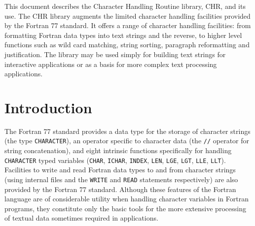 This document describes the Character Handling Routine library, CHR, 
and its use.
The CHR library augments the limited character handling facilities
provided by the Fortran 77 standard.
It offers a range of character handling facilities: from formatting
Fortran data types into text strings and the reverse, to higher level
functions such as wild card matching, string sorting, paragraph
reformatting and justification. 
The library may be used simply for building text strings for interactive
applications or as a basis for more complex text processing applications.
\newpage
%
\newcommand{\latexonlytoc}[0]{\tableofcontents}
\begin{htmlonly}
   \renewcommand{\latexonlytoc}[0]{}
\end{htmlonly}
\begin{latexonly}
   \setlength{\parskip}{0mm}
   \latexonlytoc
   \setlength{\parskip}{\medskipamount}
   \markright{\stardocname}
\end{latexonly}

\newpage
\renewcommand{\thepage}{\arabic{page}}
\setcounter{page}{1}

\section {Introduction}

The Fortran 77 standard provides a data type for the storage of
character strings (the type {\tt CHARACTER}), an operator specific to 
character data (the {\tt //} operator for string concatenation), and 
eight intrinsic functions specifically for handling {\tt CHARACTER} typed
variables ({\tt CHAR}, {\tt ICHAR}, {\tt INDEX}, {\tt LEN}, {\tt LGE}, 
{\tt LGT}, {\tt LLE}, {\tt LLT}). 
Facilities to write and read Fortran data types to and from
character strings (using internal files and the {\tt WRITE} and {\tt READ} 
statements respectively) are also provided by the Fortran 77 standard.
Although these features of the Fortran language are of considerable utility
when handling character variables in Fortran programs, they constitute only the
basic tools for the more extensive processing of textual data sometimes 
required in applications.

